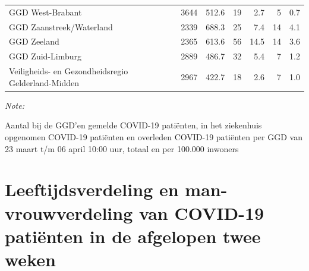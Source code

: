 \documentclass[
  english,
  man,floatsintext]{apa6}
\begin{document}
\begin{table}
\begin{threeparttable}
\begin{tabular}{lrrrrrr}
GGD West-Brabant & 3644 & 512.6 & 19 & 2.7 & 5 & 0.7\\
GGD Zaanstreek/Waterland & 2339 & 688.3 & 25 & 7.4 & 14 & 4.1\\
GGD Zeeland & 2365 & 613.6 & 56 & 14.5 & 14 & 3.6\\
GGD Zuid-Limburg & 2889 & 486.7 & 32 & 5.4 & 7 & 1.2\\
Veiligheids- en Gezondheidsregio Gelderland-Midden & 2967 & 422.7 & 18 & 2.6 & 7 & 1.0\\
\bottomrule
\end{tabular}
\begin{tablenotes}
\item \textit{Note: } 
\item Aantal bij de GGD’en gemelde COVID-19 patiënten, in het ziekenhuis opgenomen COVID-19 patiënten en overleden COVID-19 patiënten per GGD van 23 maart t/m 06 april 10:00 uur, totaal en per 100.000 inwoners
\end{tablenotes}
\end{threeparttable}
\endgroup{}
\end{table}

\newpage

\hypertarget{leeftijdsverdeling-en-man-vrouwverdeling-van-covid-19-patiuxebnten-in-de-afgelopen-twee-weken}{%
\section{Leeftijdsverdeling en man-vrouwverdeling van COVID-19 patiënten in de afgelopen twee weken}\label{leeftijdsverdeling-en-man-vrouwverdeling-van-covid-19-patiuxebnten-in-de-afgelopen-twee-weken}}
\end{document}
